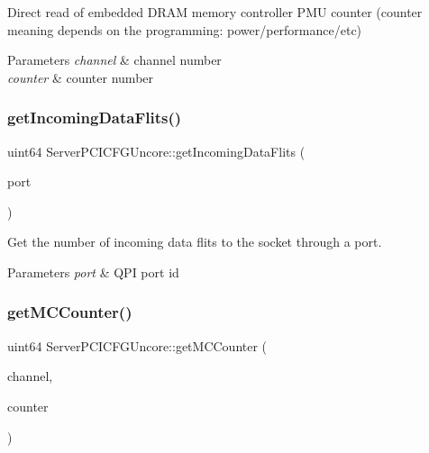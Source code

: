 Direct read of embedded D\+R\+AM memory controller P\+MU counter (counter meaning depends on the programming\+: power/performance/etc) 


\begin{DoxyParams}{Parameters}
{\em channel} & channel number \\
\hline
{\em counter} & counter number \\
\hline
\end{DoxyParams}
\mbox{\label{class_server_p_c_i_c_f_g_uncore_abaeb0a56fa35ecbd0c092b733a1f923b}} 
\subsubsection{\texorpdfstring{get\+Incoming\+Data\+Flits()}{getIncomingDataFlits()}}
{\footnotesize\ttfamily uint64 Server\+P\+C\+I\+C\+F\+G\+Uncore\+::get\+Incoming\+Data\+Flits (\begin{DoxyParamCaption}\item[{uint32}]{port }\end{DoxyParamCaption})}



Get the number of incoming data flits to the socket through a port. 


\begin{DoxyParams}{Parameters}
{\em port} & Q\+PI port id \\
\hline
\end{DoxyParams}
\mbox{\label{class_server_p_c_i_c_f_g_uncore_ad66687e98d1b74c145b79fedefc07d15}} 
\subsubsection{\texorpdfstring{get\+M\+C\+Counter()}{getMCCounter()}}
{\footnotesize\ttfamily uint64 Server\+P\+C\+I\+C\+F\+G\+Uncore\+::get\+M\+C\+Counter (\begin{DoxyParamCaption}\item[{uint32}]{channel,  }\item[{uint32}]{counter }\end{DoxyParamCaption})}



